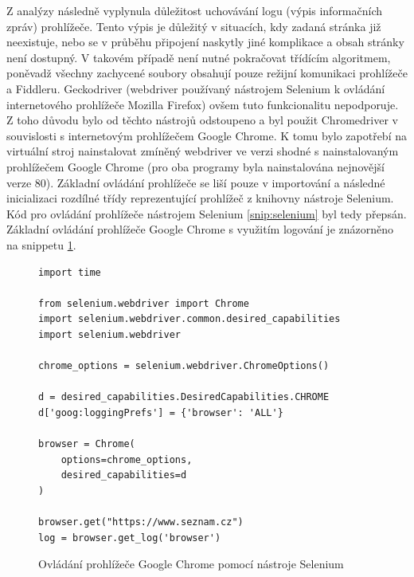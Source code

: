 \documentclass[thesis=M,czech,hidelinks]{FITthesis}[2013/05/06]
\begin{document}
Z analýzy následně vyplynula důležitost uchovávání logu (výpis informačních zpráv) prohlížeče. Tento výpis je důležitý v situacích, kdy zadaná stránka již neexistuje, nebo se v průběhu připojení naskytly jiné komplikace a obsah stránky není dostupný. V takovém případě není nutné pokračovat třídícím algoritmem, poněvadž všechny zachycené soubory obsahují pouze režijní komunikaci prohlížeče a Fiddleru. Geckodriver (webdriver používaný nástrojem Selenium k ovládání internetového prohlížeče Mozilla Firefox) ovšem tuto funkcionalitu nepodporuje. Z toho důvodu bylo od těchto nástrojů odstoupeno a byl použit Chromedriver v souvislosti s internetovým prohlížečem Google Chrome. K tomu bylo zapotřebí na virtuální stroj nainstalovat zmíněný webdriver ve verzi shodné s nainstalovaným prohlížečem Google Chrome (pro oba programy byla nainstalována nejnovější verze 80). Základní ovládání prohlížeče se liší pouze v importování a následné inicializaci rozdílné třídy reprezentující prohlížeč z knihovny nástroje Selenium. Kód pro ovládání prohlížeče nástrojem Selenium \ref{snip:selenium} byl tedy přepsán. Základní ovládání prohlížeče Google Chrome s využitím logování je znázorněno na snippetu \ref{snip:selenium_new}.

\begin{figure}[h]               
	\begin{verbatim}
import time 

from selenium.webdriver import Chrome
import selenium.webdriver.common.desired_capabilities
import selenium.webdriver

chrome_options = selenium.webdriver.ChromeOptions()

d = desired_capabilities.DesiredCapabilities.CHROME
d['goog:loggingPrefs'] = {'browser': 'ALL'}

browser = Chrome(
    options=chrome_options, 
    desired_capabilities=d
)

browser.get("https://www.seznam.cz")
log = browser.get_log('browser')
	\end{verbatim}      
	\caption{Ovládání prohlížeče Google Chrome pomocí nástroje Selenium}
	\label{snip:selenium_new}
\end{figure}
\end{document}
